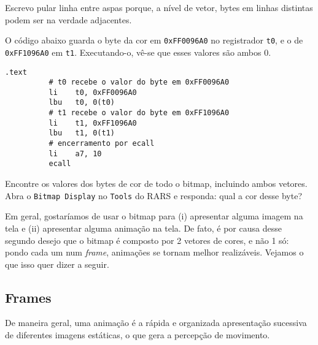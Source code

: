 \documentclass[10pt, a4paper, twoside]{article}
\begin{document}
    \begin{remark}
        Escrevo pular linha entre aspas porque, a nível de vetor, bytes em linhas distintas podem ser na verdade adjacentes.
    \end{remark}
    \begin{exemplo}
        O código abaixo guarda o byte da cor em {\tt 0xFF0096A0} no registrador {\tt t0}, e o de {\tt 0xFF1096A0} em {\tt t1}.
        Executando-o, vê-se que esses valores são ambos 0.
        \begin{lstlisting}[caption=Verificando bytes de cor]
          .text
          # t0 recebe o valor do byte em 0xFF0096A0 
          li	t0, 0xFF0096A0
          lbu	t0, 0(t0)
          # t1 recebe o valor do byte em 0xFF1096A0
          li	t1, 0xFF1096A0
          lbu	t1, 0(t1)
          # encerramento por ecall
          li	a7, 10
          ecall
        \end{lstlisting}
    \end{exemplo}
    \begin{exercicio}
        Encontre os valores dos bytes de cor de todo o bitmap, incluindo ambos vetores. 
        Abra o {\tt Bitmap Display} no {\tt Tools} do RARS e responda: qual a cor desse byte?
    \end{exercicio}
    Em geral, gostaríamos de usar o bitmap para (i) apresentar alguma imagem na tela e (ii) apresentar alguma animação na tela.
    De fato, é por causa desse segundo desejo que o bitmap é composto por 2 vetores de cores, e não 1 só:
    pondo cada um num \textit{frame}, animações se tornam melhor realizáveis.
    Vejamos o que isso quer dizer a seguir.
    
    
    
    \subsection{Frames}
    \label{sec:frames}
        De maneira geral, uma animação é a rápida e organizada apresentação sucessiva de diferentes imagens estáticas, o que gera a percepção de movimento.
        
\end{document}
